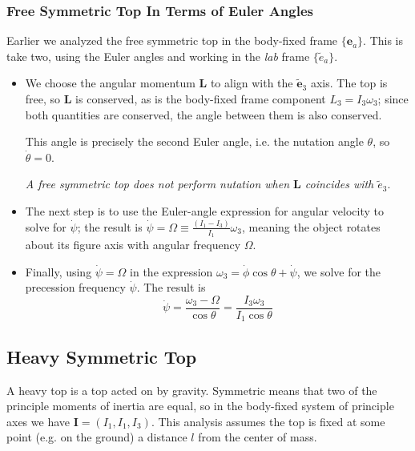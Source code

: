 \documentclass[11pt, a4paper]{article}
\newcommand{\e}{\mathbf{e}} %
\begin{document}
\subsubsection{Free Symmetric Top In Terms of Euler Angles}
Earlier we analyzed the free symmetric top in the body-fixed frame $ \{\e_{a} \} $. This is take two, using the Euler angles and working in the \textit{lab} frame $ \{\tilde{e}_{a} \} $.
\begin{itemize}
	\item We choose the angular momentum $ \mathbf{L} $ to align with the $ \tilde{\e}_{3} $ axis. The top is free, so $ \bm{L} $ is conserved, as is the body-fixed frame component $ L_{3} = I_{3} \omega_{3} $; since both quantities are conserved, the angle between them is also conserved. 
	
	This angle is precisely the second Euler angle, i.e. the nutation angle $ \theta $, so $ \dot{\theta} = 0 $.
	
	\textit{A free symmetric top does not perform nutation when $ \bm{L} $ coincides with $ \tilde{e}_{3} $}.
	
	\item The next step is to use the Euler-angle expression for angular velocity to solve for $ \dot{\psi} $; the result is $ \dot{\psi} = \Omega \equiv \frac{(I_{1} - I_{3})}{I_{1}} \omega_{3}$, meaning the object rotates about its figure axis with angular frequency $ \Omega $.
	
	\item Finally, using $  \dot{\psi} = \Omega $ in the expression $ \omega_{3} = \dot{\phi} \cos \theta + \dot{\psi}  $, we solve for the precession frequency $ \dot{\psi} $. The result is
	\begin{equation*}
		\dot{\psi} = \frac{\omega_3 - \Omega}{\cos \theta} = \frac{I_{3} \omega_3}{I_1 \cos \theta} 
	\end{equation*}
\end{itemize}

\subsection{Heavy Symmetric Top}
A heavy top is a top acted on by gravity. Symmetric means that two of the principle moments of inertia are equal, so in the body-fixed system of principle axes we have $ \mathbf{I} = (I_1, I_1, I_3) $. This analysis assumes the top is fixed at some point (e.g. on the ground) a distance $ l $ from the center of mass.
\end{document}
